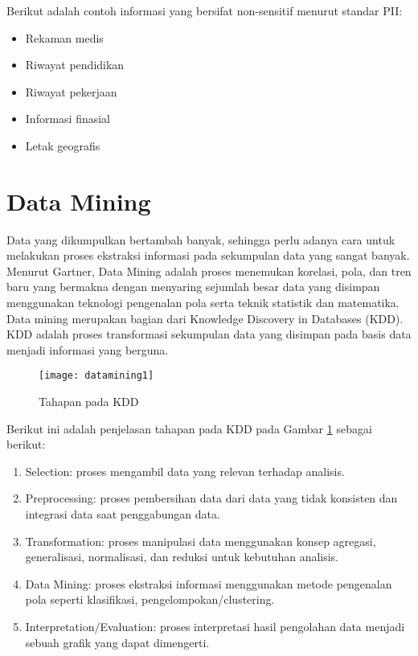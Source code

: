 \noindent Berikut adalah contoh informasi yang bersifat non-sensitif menurut standar PII:
\begin{itemize}
\item Rekaman medis
\item Riwayat pendidikan
\item Riwayat pekerjaan 
\item Informasi finasial
\item Letak geografis
\end{itemize}

\newpage
\section{Data Mining}
Data yang dikumpulkan bertambah banyak, sehingga perlu adanya cara untuk melakukan proses ekstraksi informasi pada sekumpulan data yang sangat banyak. Menurut Gartner, Data Mining adalah proses menemukan korelasi, pola, dan tren baru yang bermakna dengan menyaring sejumlah besar data yang disimpan menggunakan teknologi pengenalan pola serta teknik statistik dan matematika. Data mining merupakan bagian dari Knowledge Discovery in Databases (KDD). KDD adalah proses transformasi sekumpulan data yang disimpan pada basis data menjadi informasi yang berguna.\\

\begin{figure}[H]
	\centering
	\texttt{[image: datamining1]}
	\caption{Tahapan pada KDD}
	\label{fig:datamining1}
\end{figure}

\noindent Berikut ini adalah penjelasan tahapan pada KDD pada Gambar \ref{fig:datamining1} sebagai berikut:

\begin{enumerate}
\item Selection: proses mengambil data yang relevan terhadap analisis.
\item Preprocessing: proses pembersihan data dari data yang tidak konsisten dan integrasi data saat penggabungan data.
\item Transformation: proses manipulasi data menggunakan konsep agregasi, generalisasi, normalisasi, dan reduksi untuk kebutuhan analisis.
\item Data Mining: proses ekstraksi informasi menggunakan metode pengenalan pola seperti klasifikasi, pengelompokan/clustering.
\item Interpretation/Evaluation: proses interpretasi hasil pengolahan data menjadi sebuah grafik yang dapat dimengerti.
\end{enumerate}


